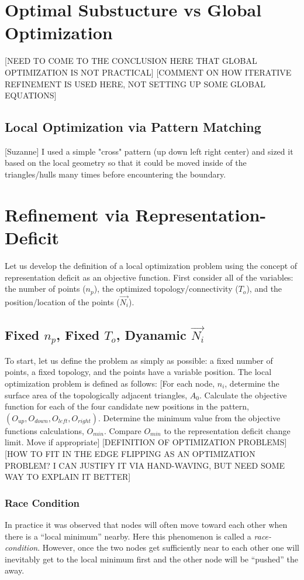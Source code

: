 \documentclass[11pt]{article}
\begin{document}
\section{Optimal Substucture vs Global Optimization}
[NEED TO COME TO THE CONCLUSION HERE THAT GLOBAL OPTIMIZATION IS NOT
PRACTICAL] [COMMENT ON HOW ITERATIVE REFINEMENT IS USED HERE, NOT
SETTING UP SOME GLOBAL EQUATIONS]
\subsection{Local Optimization via Pattern Matching}
[Suzanne] I used a simple "cross" pattern (up down left right center)
and sized it based on the local geometry so that it could be moved
inside of the triangles/hulls many times before encountering the
boundary.

\section{Refinement via Representation-Deficit}
Let us develop the definition of a local optimization problem using the
concept of representation deficit as an objective function. First
consider all of the variables: the number of points ($n_p$), the
optimized topology/connectivity ($T_o$), and the position/location of
the points ($\vec{N_i}$).
\subsection{Fixed $n_p$, Fixed $T_o$, Dyanamic $\vec{N_i}$}
To start, let us define the problem as simply as possible: a fixed
number of points, a fixed topology, and the points have a variable
position.  The local optimization problem is defined as follows: [For
each node, $n_i$, determine the surface area of the topologically
adjacent triangles, $A_0$. Calculate the objective function for each of
the four candidate new positions in the pattern, $\left(O_{up},
O_{down}, O_{left}, O_{right}\right)$. Determine the minimum value from
the objective functions calculations, $O_{min}$. Compare $O_{min}$ to
the representation deficit change limit. Move if appropriate]
[DEFINITION OF OPTIMIZATION PROBLEMS]
[HOW TO FIT IN THE EDGE FLIPPING AS AN OPTIMIZATION PROBLEM? I CAN
JUSTIFY IT VIA HAND-WAVING, BUT NEED SOME WAY TO EXPLAIN IT BETTER]
\subsubsection{Race Condition}
In practice it was observed that nodes will often move toward each other
when there is a ``local minimum'' nearby. Here this phenomenon is called
a {\it race-condition}. However, once the two nodes get sufficiently
near to each other one will inevitably get to the local minimum first
and the other node will be ``pushed'' the away.
\end{document}
